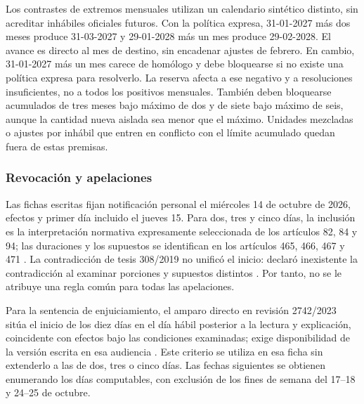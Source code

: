 Los contrastes de extremos mensuales utilizan un calendario sintético distinto, sin acreditar inhábiles oficiales futuros. Con la política expresa, 31-01-2027 más dos meses produce 31-03-2027 y 29-01-2028 más un mes produce 29-02-2028. El avance es directo al mes de destino, sin encadenar ajustes de febrero. En cambio, 31-01-2027 más un mes carece de homólogo y debe bloquearse si no existe una política expresa para resolverlo. La reserva afecta a ese negativo y a resoluciones insuficientes, no a todos los positivos mensuales. También deben bloquearse acumulados de tres meses bajo máximo de dos y de siete bajo máximo de seis, aunque la cantidad nueva aislada sea menor que el máximo. Unidades mezcladas o ajustes por inhábil que entren en conflicto con el límite acumulado quedan fuera de estas premisas.

\subsubsection{Revocación y apelaciones}

Las fichas escritas fijan notificación personal el miércoles 14 de octubre de 2026, efectos y primer día incluido el jueves 15. Para dos, tres y cinco días, la inclusión es la interpretación normativa expresamente seleccionada de los artículos 82, 84 y 94; las duraciones y los supuestos se identifican en los artículos 465, 466, 467 y 471 \cite{cnpp_consolidado2025}. La contradicción de tesis 308/2019 no unificó el inicio: declaró inexistente la contradicción al examinar porciones y supuestos distintos \cite[párrs.~23--35 y resolutivo único]{scjn_ct308_2019}. Por tanto, no se le atribuye una regla común para todas las apelaciones.

Para la sentencia de enjuiciamiento, el amparo directo en revisión 2742/2023 sitúa el inicio de los diez días en el día hábil posterior a la lectura y explicación, coincidente con efectos bajo las condiciones examinadas; exige disponibilidad de la versión escrita en esa audiencia \cite[párrs.~101--102, 116 y 146]{scjn_adr2742_2023}. Este criterio se utiliza en esa ficha sin extenderlo a las de dos, tres o cinco días. Las fechas siguientes se obtienen enumerando los días computables, con exclusión de los fines de semana del 17--18 y 24--25 de octubre.

